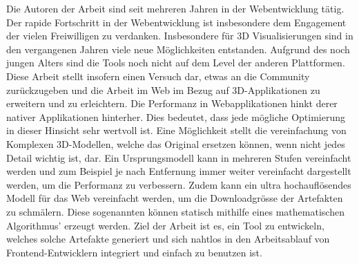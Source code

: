 Die Autoren der Arbeit sind seit mehreren Jahren in der Webentwicklung tätig. Der rapide Fortschritt in der Webentwicklung ist insbesondere dem Engagement der vielen Freiwilligen zu verdanken.
Insbesondere für 3D Visualisierungen sind in den vergangenen Jahren viele neue Möglichkeiten entstanden. Aufgrund des noch jungen Alters sind die Tools noch nicht auf dem Level der anderen Plattformen. Diese Arbeit stellt insofern einen Versuch dar, etwas an die Community zurückzugeben und die Arbeit im Web im Bezug auf 3D-Applikationen zu erweitern und zu erleichtern.
Die Performanz in Webapplikationen hinkt derer nativer Applikationen hinterher. Dies bedeutet, dass jede mögliche Optimierung in dieser Hinsicht sehr wertvoll ist.
Eine Möglichkeit stellt die vereinfachung von Komplexen 3D-Modellen, welche das Original ersetzen können, wenn nicht jedes Detail wichtig ist, dar.
Ein Ursprungsmodell kann in mehreren Stufen vereinfacht werden und zum Beispiel je nach Entfernung immer weiter vereinfacht dargestellt werden, um die Performanz zu verbessern.
Zudem kann ein ultra hochauflösendes Modell für das Web vereinfacht werden, um die Downloadgrösse der Artefakten zu schmälern.
Diese sogenannten  können statisch mithilfe eines mathematischen Algorithmus' erzeugt werden.
Ziel der Arbeit ist es, ein Tool zu entwickeln, welches solche Artefakte generiert und sich nahtlos in den Arbeitsablauf von Frontend-Entwicklern integriert und einfach zu benutzen ist.
